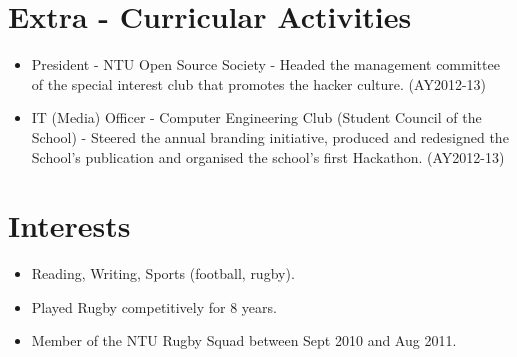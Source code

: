 \section{Extra - Curricular
Activities}\label{extra---curricular-activities}

\begin{itemize}
\tightlist
\item
  President - NTU Open Source Society - Headed the management committee
  of the special interest club that promotes the hacker culture.
  (AY2012-13)
\item
  IT (Media) Officer - Computer Engineering Club (Student Council of the
  School) - Steered the annual branding initiative, produced and
  redesigned the School's publication and organised the school's first
  Hackathon. (AY2012-13)
\end{itemize}

\section{Interests}\label{interests}

\begin{itemize}
\tightlist
\item
  Reading, Writing, Sports (football, rugby).
\item
  Played Rugby competitively for 8 years.
\item
  Member of the NTU Rugby Squad between Sept 2010 and Aug 2011.
\end{itemize}
